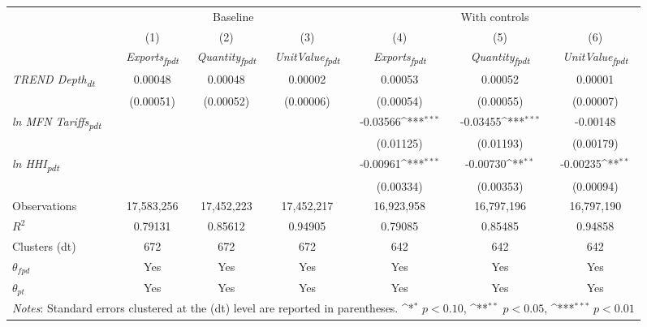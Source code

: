 {
\def\sym#1{\ifmmode^{#1}\else\(^{#1}\)\fi}
\begin{tabular}{l*{6}{c}}
\toprule
&\multicolumn{3}{c}{Baseline}&\multicolumn{3}{c}{With controls}\\\cmidrule(lr){2-4}\cmidrule(lr){5-7}
&(1)&(2)&(3)&(4)&(5)&(6)\\
&\textit{Exports\textsubscript{fpdt}}&\textit{Quantity\textsubscript{fpdt}}&\textit{UnitValue\textsubscript{fpdt}}&\textit{Exports\textsubscript{fpdt}}&\textit{Quantity\textsubscript{fpdt}}&\textit{UnitValue\textsubscript{fpdt}}\\
\midrule
\textit{TREND Depth\textsubscript{dt}} & 0.00048 & 0.00048 & 0.00002 & 0.00053 & 0.00052 & 0.00001\\
 & (0.00051) & (0.00052) & (0.00006) & (0.00054) & (0.00055) & (0.00007)\\
\addlinespace
\textit{ln MFN Tariffs\textsubscript{pdt}} &  &  &  & -0.03566\sym{***} & -0.03455\sym{***} & -0.00148\\
 &  &  &  & (0.01125) & (0.01193) & (0.00179)\\
\addlinespace
\textit{ln HHI\textsubscript{pdt}} &  &  &  & -0.00961\sym{***} & -0.00730\sym{**} & -0.00235\sym{**}\\
 &  &  &  & (0.00334) & (0.00353) & (0.00094)\\
\midrule
Observations & 17,583,256 & 17,452,223 & 17,452,217 & 16,923,958 & 16,797,196 & 16,797,190\\
$R^{2}$ & 0.79131 & 0.85612 & 0.94905 & 0.79085 & 0.85485 & 0.94858\\
Clusters (dt) & 672 & 672 & 672 & 642 & 642 & 642\\
$\theta_{fpd}$ & Yes & Yes & Yes & Yes & Yes & Yes\\
$\theta_{pt}$ & Yes & Yes & Yes & Yes & Yes & Yes\\
\bottomrule
\multicolumn{7}{l}{\footnotesize \textit{Notes}: Standard errors clustered at the (dt) level are reported in parentheses. \sym{*} \(p<0.10\), \sym{**} \(p<0.05\), \sym{***} \(p<0.01\)}\\
\end{tabular}
}
